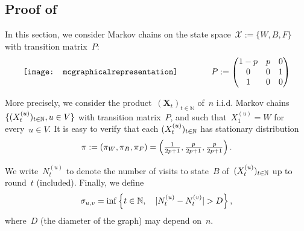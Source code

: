 \documentclass{article}
\begin{document}
\subsection{\texorpdfstring{Proof of }{Proof of Theorem 2}} \label{sec:main_proof}

In this section, we consider Markov chains on the state space~$\mathcal{X} := \{W,B,F\}$ with transition matrix~$P$:
\begin{equation} \label{eq:transition_matrix}
\vcenter{\hbox{\texttt{[image: mcgraphicalrepresentation]}}}
\qquad\qquad
P := 
    \begin{pmatrix}
    1-p & p & 0\\
    0 & 0 & 1\\
    1 & 0 & 0
    \end{pmatrix}
\end{equation}



More precisely, we consider the product~$(\mathbf{X}_t)_{t \in \mathbb{N}}$ of~$n$ i.i.d. Markov chains~$\{(X^{(u)}_t)_{t\in \operatorname{\mathbb{N}}}, u \in V\}$ with transition matrix~$P$, and such that~$X^{(u)}_1  = W$ for every~$u \in V$.
It is easy to verify that each $(X_t^{(u)})_{t \in \operatorname{\mathbb{N}}}$ has stationary distribution 
\begin{equation}
    \pi := (\pi_W, \pi_B, \pi_F) = \left( \tfrac{1}{2p+1},\tfrac{p}{2p+1},\tfrac{p}{2p+1} \right).
    \label{eq:stationary_distribution}
\end{equation}



We write~$N^{(u)}_t$ to denote the number of visits to state~$B$ of~$(X^{(u)}_t)_{t\in \operatorname{\mathbb{N}}}$ up to round~$t$ (included).
Finally, we define
\begin{equation}
    \sigma_{u,v} = \inf \left\{ t \in \operatorname{\mathbb{N}}, \quad |N^{(u)}_t - N^{(v)}_t| > D \right\},
    \label{eq:def_sigma}
\end{equation}
where~$D$ (the diameter of the graph) may depend on~$n$.
\end{document}
